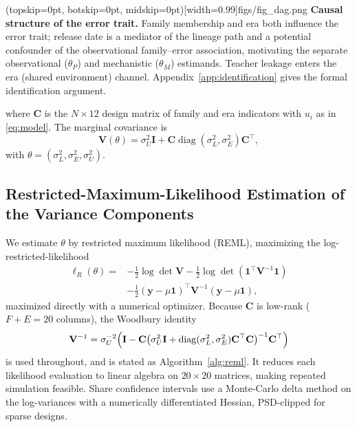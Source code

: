 \documentclass{ieeeaccess}
\theoremstyle{definition}
\theoremstyle{plain}
\begin{document}
\Figure[t!](topskip=0pt, botskip=0pt, midskip=0pt)[width=0.99\columnwidth]{figs/fig_dag.png}
{ \textbf{Causal structure of the error trait.} Family membership and era both
influence the error trait; release date is a mediator of the lineage path and a
potential confounder of the observational family--error association, motivating
the separate observational ($\theta_{P}$) and mechanistic ($\theta_{M}$)
estimands. Teacher leakage enters the era (shared environment) channel.
Appendix~\ref{app:identification} gives the formal identification
argument.\label{fig:dag}}

where $\mathbf{C}$ is the $N\times 12$ design matrix of family and era indicators
with $u_{i}$ as in \eqref{eq:model}. The marginal covariance is
\begin{equation}
\mathbf{V}(\theta) = \sigma^{2}_{U}\mathbf{I} + \mathbf{C}
\operatorname{diag}(\sigma^{2}_{L},\sigma^{2}_{E})\mathbf{C}^{\top},
\label{eq:cov}
\end{equation}
with $\theta=(\sigma^{2}_{L},\sigma^{2}_{E},\sigma^{2}_{U})$.

\subsection{Restricted-Maximum-Likelihood Estimation of the Variance Components}
We estimate $\theta$ by restricted maximum likelihood (REML), maximizing the
log-restricted-likelihood \cite{harville1977,patterson1971}
\begin{equation}
\begin{split}
\ell_{R}(\theta) = {}& -\tfrac{1}{2}\log\det\mathbf{V}
-\tfrac{1}{2}\log\det(\mathbf{1}^{\top}\mathbf{V}^{-1}\mathbf{1}) \\
& -\tfrac{1}{2}(\mathbf{y}-\mu\mathbf{1})^{\top}\mathbf{V}^{-1}
(\mathbf{y}-\mu\mathbf{1}),
\end{split}
\label{eq:reml}
\end{equation}
maximized directly with a numerical optimizer. Because $\mathbf{C}$ is low-rank
($F+E=20$ columns), the Woodbury identity
\begin{equation}
\mathbf{V}^{-1} = \sigma_{U}^{-2}\Bigl(\mathbf{I} -
\mathbf{C}\bigl(\sigma^{2}_{U}\mathbf{I} +
\operatorname{diag}(\sigma^{2}_{L},\sigma^{2}_{E})\mathbf{C}^{\top}\mathbf{C}\bigr)^{-1}
\mathbf{C}^{\top}\Bigr)
\label{eq:woodbury}
\end{equation}
is used throughout, and is stated as Algorithm~\ref{alg:reml}. It
reduces each likelihood evaluation to linear algebra on $20\times20$ matrices,
making repeated simulation feasible. Share confidence intervals use a Monte-Carlo
delta method on the log-variances with a numerically differentiated Hessian,
PSD-clipped for sparse designs.
\end{document}
